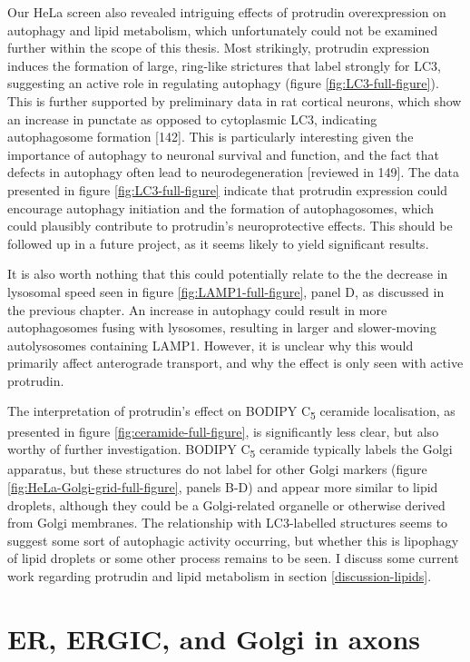 \documentclass[
  12pt,
  a4paper,
]{book}
\begin{document}
Our HeLa screen also revealed intriguing effects of protrudin overexpression on autophagy and lipid metabolism, which unfortunately could not be examined further within the scope of this thesis. Most strikingly, protrudin expression induces the formation of large, ring-like strictures that label strongly for LC3, suggesting an active role in regulating autophagy (figure \ref{fig:LC3-full-figure}). This is further supported by preliminary data in rat cortical neurons, which show an increase in punctate as opposed to cytoplasmic LC3, indicating autophagosome formation {[}142{]}. This is particularly interesting given the importance of autophagy to neuronal survival and function, and the fact that defects in autophagy often lead to neurodegeneration {[}reviewed in 149{]}. The data presented in figure \ref{fig:LC3-full-figure} indicate that protrudin expression could encourage autophagy initiation and the formation of autophagosomes, which could plausibly contribute to protrudin's neuroprotective effects. This should be followed up in a future project, as it seems likely to yield significant results.

It is also worth nothing that this could potentially relate to the the decrease in lysosomal speed seen in figure \ref{fig:LAMP1-full-figure}, panel D, as discussed in the previous chapter. An increase in autophagy could result in more autophagosomes fusing with lysosomes, resulting in larger and slower-moving autolysosomes containing LAMP1. However, it is unclear why this would primarily affect anterograde transport, and why the effect is only seen with active protrudin.

The interpretation of protrudin's effect on BODIPY C\textsubscript{5} ceramide localisation, as presented in figure \ref{fig:ceramide-full-figure}, is significantly less clear, but also worthy of further investigation. BODIPY C\textsubscript{5} ceramide typically labels the Golgi apparatus, but these structures do not label for other Golgi markers (figure \ref{fig:HeLa-Golgi-grid-full-figure}, panels B-D) and appear more similar to lipid droplets, although they could be a Golgi-related organelle or otherwise derived from Golgi membranes. The relationship with LC3-labelled structures seems to suggest some sort of autophagic activity occurring, but whether this is lipophagy of lipid droplets or some other process remains to be seen. I discuss some current work regarding protrudin and lipid metabolism in section \ref{discussion-lipids}.

\chapter{ER, ERGIC, and Golgi in axons}\label{er-ergic-and-golgi-in-axons}
\end{document}
